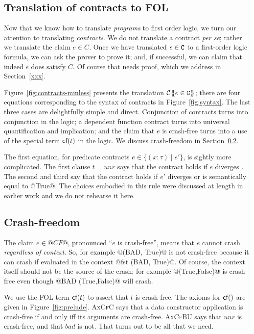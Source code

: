 \subsection{Translation of contracts to FOL} \label{s:contracts-fol}

Now that we know how to translate \emph{programs} to first order
logic, we turn our attention to translating \emph{contracts}.  We do
not translate a contract \emph{per se}; rather we translate the claim
$e \in C$.  Once we have translated $e \in {\tt C}$ to a first-order logic
formula, we can ask the prover to prove it; and, if successful, we can
claim that indeed $e$ does satisfy $C$.  Of course that needs proof,
which we address in Section~\ref{xxx}.

Figure~\ref{fig:contracts-minless} presents the translation
${\cal C}\{\!\!\{e \in {\tt C}\}\!\!\}$; there are four equations corresponding
to the syntax of contracts in Figure~\ref{fig:syntax}.
The last three cases are delightfully simple and direct.  Conjunction of contracts
turns into conjunction in the logic; a dependent function contract turns
into universal quantification and implication; and the claim that $e$ is
crash-free turns into a use of the special term $\textsf{cf}(t)$ in the logic.
We discuss crash-freedom in Section~\ref{s:cf-fol}.

The first equation, for predicate contracts $e \in \{(x{:}\tau) \mid e' \}$,
is sightly more complicated.
The first clause $t=unr$ says that the contract holds if $e$ diverges .
The second and third say that the contract holds if $e'$ diverges or is semantically
equal to @True@.  The choices embodied in this rule were discussed at length
in earlier work \cite{xu+:contracts} and we do not rehearse it here.

\subsection{Crash-freedom} \label{s:cf-fol}

The claim $e \in @CF@$, pronounced ``$e$ is crash-free'', means that $e$ cannot
crash \emph{regardless of context}.  So, for example @(BAD, True)@ is not crash-free
because it can crash if evaluated in the context @fst (BAD, True)@.  Of course,
the context itself should not be the source of the crash; for example @(True,False)@ is
crash-free even though @BAD (True,False)@ will crash.

We use the FOL term $\textsf{cf}(t)$ to assert that $t$ is crash-free. The axioms for $\textsf{cf}()$
are given in Figure~\ref{fig:prelude}.  \textsc{AxCfC} says that a data constructor application
is crash-free if and only iff its arguments are crash-free.  \textsc{AxCfBU} says that
$unr$ is crash-free, and that $bad$ is not.  That turns out to be all that we need.


